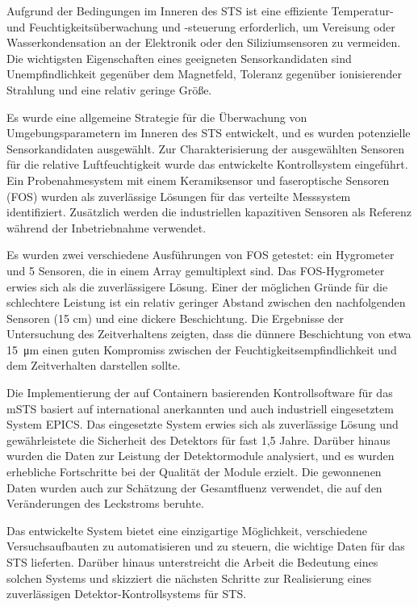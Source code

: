Aufgrund der Bedingungen im Inneren des \gls{STS} ist eine effiziente Temperatur- und Feuchtigkeitsüberwachung und -steuerung erforderlich, um Vereisung oder Wasserkondensation an der Elektronik oder den Siliziumsensoren zu vermeiden. Die wichtigsten Eigenschaften eines geeigneten Sensorkandidaten sind Unempfindlichkeit gegenüber dem Magnetfeld, Toleranz gegenüber ionisierender Strahlung und eine relativ geringe Größe.

Es wurde eine allgemeine Strategie für die Überwachung von Umgebungsparametern im Inneren des \gls{STS} entwickelt, und es wurden potenzielle Sensorkandidaten ausgewählt. Zur Charakterisierung der ausgewählten Sensoren für die relative Luftfeuchtigkeit wurde das entwickelte Kontrollsystem eingeführt. Ein Probenahmesystem mit einem Keramiksensor und faseroptische Sensoren (\gls{FOS}) wurden als zuverlässige Lösungen für das verteilte Messsystem identifiziert. Zusätzlich werden die industriellen kapazitiven Sensoren als Referenz während der Inbetriebnahme verwendet.

Es wurden zwei verschiedene Ausführungen von \gls{FOS} getestet: ein Hygrometer und 5 Sensoren, die in einem Array gemultiplext sind. Das \gls{FOS}-Hygrometer erwies sich als die zuverlässigere Lösung. Einer der möglichen Gründe für die schlechtere Leistung ist ein relativ geringer Abstand zwischen den nachfolgenden Sensoren (15 cm) und eine dickere Beschichtung. Die Ergebnisse der Untersuchung des Zeitverhaltens zeigten, dass die dünnere Beschichtung von etwa \SI{15}{\micro\metre} einen guten Kompromiss zwischen der Feuchtigkeitsempfindlichkeit und dem Zeitverhalten darstellen sollte. 

Die Implementierung der auf Containern basierenden Kontrollsoftware für das \gls{mSTS} basiert auf international anerkannten und auch industriell eingesetztem System EPICS. Das eingesetzte System erwies sich als zuverlässige Lösung und gewährleistete die Sicherheit des Detektors für fast 1,5 Jahre. Darüber hinaus wurden die Daten zur Leistung der Detektormodule analysiert, und es wurden erhebliche Fortschritte bei der Qualität der Module erzielt. Die gewonnenen Daten wurden auch zur Schätzung der Gesamtfluenz verwendet, die auf den Veränderungen des Leckstroms beruhte. 

Das entwickelte System bietet eine einzigartige Möglichkeit, verschiedene Versuchsaufbauten zu automatisieren und zu steuern, die wichtige Daten für das \gls{STS} lieferten. Darüber hinaus unterstreicht die Arbeit die Bedeutung eines solchen Systems und skizziert die nächsten Schritte zur Realisierung eines zuverlässigen Detektor-Kontrollsystems für \gls{STS}.